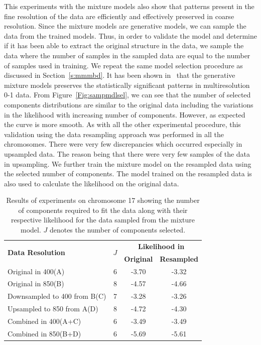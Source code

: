 This experiments with the mixture models also show that patterns present in the fine resolution of the data are efficiently and effectively preserved in coarse resolution.  Since the mixture models are generative models, we can sample the data from the trained models. Thus, in order to validate the model and determine if it has been able to extract the original structure in the data, we sample the data where the number of samples in the sampled data are equal to the number of samples used in training. We repeat the same model selection procedure as discussed in Section~\ref{s:mmmbd}. It has been shown in~\cite{premprib} that the generative mixture models preserves the statistically significant patterns in multiresolution \mbox{0-1} data. From Figure~\ref{Fig:sampmdlsel}, we can see that the number of selected components distributions are similar to the original data including the variations in the likelihood with increasing number of components. However, as expected the curve is more smooth. As with all the other experimental procedure, this validation using the data resampling approach was performed in all the chromosomes. There were very few discrepancies which occurred especially  in upsampled data. The reason being that there were very few samples of the data in upsampling. We further train the mixture model on the resampled data using the selected number of components. The model trained on the resampled data is also used to calculate the likelihood on the original data. 

 \begin{table}
  \centering
  \begin{tabular}{|l|c|c|c|}
    \hline
    \multirow{2}{*}{\textbf{Data Resolution}} & \multirow{2}{*}{\textbf{$J$}} &  \multicolumn{2}{|c|}{\textbf{Likelihood in}} \\ \cline{3-4}   
				& 	&\textbf{Original} & \textbf{Resampled} \\ \hline   
    Original in 400(A)		& 6	& -3.70	& -3.32	\\ \hline
    Original in 850(B)		& 8	& -4.57	& -4.66	\\ \hline
    Downsampled to 400 from B(C)& 7	& -3.28	& -3.26	\\ \hline
    Upsampled to 850 from A(D)	& 8	& -4.72	& -4.30	\\ \hline
    Combined in 400(A+C)	& 6	& -3.49	& -3.49	\\ \hline
    Combined in 850(B+D)	& 6	& -5.69	& -5.61	\\ \hline  
  \end{tabular}
  \caption[Results on Chromosome 17 in data sampled from model]{Results of experiments on chromosome 17 showing the number of components required to fit the data along with their respective likelihood for the data sampled from the mixture model. $J$ denotes the number of components selected.} \label{Tab:sampResults}
\end{table}

